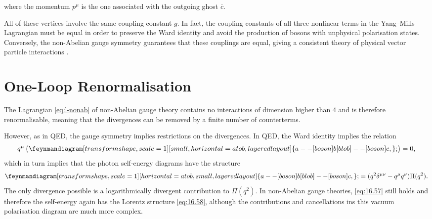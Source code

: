where the momentum $p^{\mu}$ is the one associated with the outgoing ghost $\overline{c}{}$.
\begin{remark}
  All of these vertices involve the same coupling constant $g$.
  In fact, the coupling constants of all three nonlinear terms in the Yang--Mills Lagrangian must be equal in order to preserve the Ward identity and avoid the production of bosons with unphysical polarisation states.
  Conversely, the non-Abelian gauge symmetry guarantees that these couplings are equal, giving a consistent theory of physical vector particle interactions \cite[pp.~508]{peskin}.
\end{remark}


\section{One-Loop Renormalisation}%
\label{sec:one_loop_renormalisation}

\begin{leftbar}
  The Lagrangian \eqref{eq:l-nonab} of non-Abelian gauge theory contains no interactions of dimension higher than $4$ and is therefore renormalisable, meaning that the divergences can be removed by a finite number of counterterms.

  However, as in QED, the gauge symmetry implies restrictions on the divergences.
  In QED, the Ward identity implies the relation
  \begin{equation}
    \label{eq:16.57}
    q^{\mu} \left( 
      \begin{gathered}
        \feynmandiagram[transform shape, scale=1][small, horizontal=a to b, layered layout] {
          a -- [boson] b [blob] -- [boson] c,
        };
      \end{gathered}
    \right) = 0,
  \end{equation}
  which in turn implies that the photon self-energy diagrams have the structure
  \begin{equation}
    \label{eq:16.58}
    \begin{gathered}
      \feynmandiagram[transform shape, scale=1][horizontal=a to b, small, layered layout] {
        a --[boson] b [blob] -- [boson] c,
      };
    \end{gathered}
    = (q^2 \delta^{\mu\nu} - q^{\mu} q^{\nu}) \Pi(q^2).
  \end{equation}
  The only divergence possible is a logarithmically divergent contribution to $\Pi(q^2)$.
  In non-Abelian gauge theories, \eqref{eq:16.57} still holds and therefore the self-energy again has the Lorentz structure \eqref{eq:16.58}, although the contributions and cancellations ins this vacuum polarisation diagram are much more complex.
\end{leftbar}

